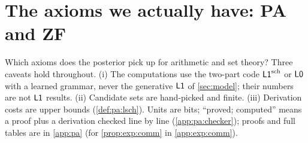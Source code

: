 \providecommand{\pabrk}{\hfil\penalty0\hfilneg}
\providecommand{\paR}[1]{\mathsf{R}_{#1}}
\providecommand{\expth}[1]{\textsf{#1}}
\providecommand{\crefabbrev}{}

\section{The axioms we actually have: PA and ZF}\label{sec:pa}

Which axioms does the posterior pick up for arithmetic and set theory? Three caveats hold throughout. (i) The computations use the two-part code $\mathord{\mathsf{L1}}^{\mathrm{sch}}$ or $\mathord{\mathsf{L0}}$ with a learned grammar, never the generative $\mathord{\mathsf{L1}}$ of \cref{sec:model}; their numbers are not $\mathord{\mathsf{L1}}$ results. (ii) Candidate sets are hand-picked and finite. (iii) Derivation costs are upper bounds (\cref{def:pa:lsch}). Units are bits; ``proved; computed'' means a proof plus a derivation checked line by line (\cref{app:pa:checker}); proofs and full tables are in \cref{app:pa} (for \cref{prop:exp:comm} in \cref{app:exp:comm}).

